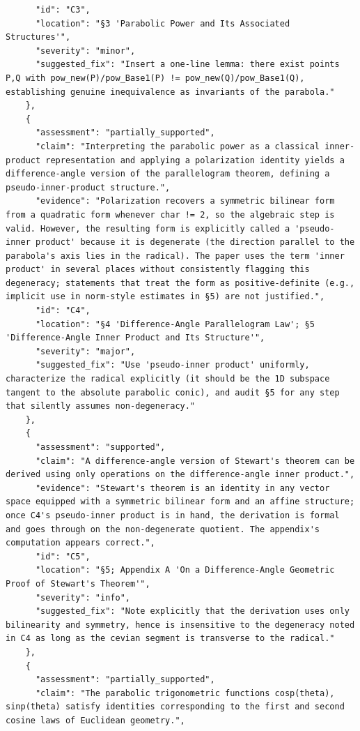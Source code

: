 \documentclass[11pt]{article}
\begin{document}
\begin{verbatim}
      "id": "C3",
      "location": "§3 'Parabolic Power and Its Associated Structures'",
      "severity": "minor",
      "suggested_fix": "Insert a one-line lemma: there exist points P,Q with pow_new(P)/pow_Base1(P) != pow_new(Q)/pow_Base1(Q), establishing genuine inequivalence as invariants of the parabola."
    },
    {
      "assessment": "partially_supported",
      "claim": "Interpreting the parabolic power as a classical inner-product representation and applying a polarization identity yields a difference-angle version of the parallelogram theorem, defining a pseudo-inner-product structure.",
      "evidence": "Polarization recovers a symmetric bilinear form from a quadratic form whenever char != 2, so the algebraic step is valid. However, the resulting form is explicitly called a 'pseudo-inner product' because it is degenerate (the direction parallel to the parabola's axis lies in the radical). The paper uses the term 'inner product' in several places without consistently flagging this degeneracy; statements that treat the form as positive-definite (e.g., implicit use in norm-style estimates in §5) are not justified.",
      "id": "C4",
      "location": "§4 'Difference-Angle Parallelogram Law'; §5 'Difference-Angle Inner Product and Its Structure'",
      "severity": "major",
      "suggested_fix": "Use 'pseudo-inner product' uniformly, characterize the radical explicitly (it should be the 1D subspace tangent to the absolute parabolic conic), and audit §5 for any step that silently assumes non-degeneracy."
    },
    {
      "assessment": "supported",
      "claim": "A difference-angle version of Stewart's theorem can be derived using only operations on the difference-angle inner product.",
      "evidence": "Stewart's theorem is an identity in any vector space equipped with a symmetric bilinear form and an affine structure; once C4's pseudo-inner product is in hand, the derivation is formal and goes through on the non-degenerate quotient. The appendix's computation appears correct.",
      "id": "C5",
      "location": "§5; Appendix A 'On a Difference-Angle Geometric Proof of Stewart's Theorem'",
      "severity": "info",
      "suggested_fix": "Note explicitly that the derivation uses only bilinearity and symmetry, hence is insensitive to the degeneracy noted in C4 as long as the cevian segment is transverse to the radical."
    },
    {
      "assessment": "partially_supported",
      "claim": "The parabolic trigonometric functions cosp(theta), sinp(theta) satisfy identities corresponding to the first and second cosine laws of Euclidean geometry.",

\end{verbatim}
\end{document}
